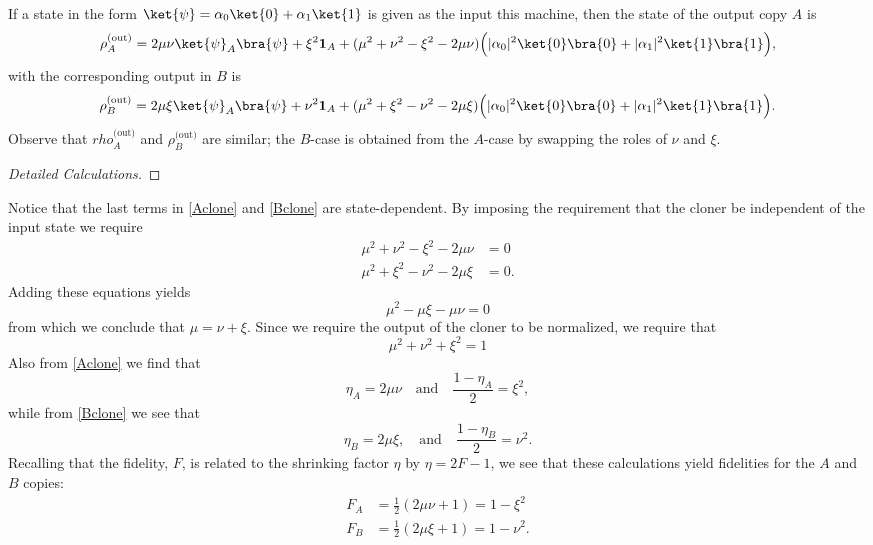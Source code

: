 \documentclass[reqno]{amsart}
\numberwithin{lemma}{section}
\numberwithin{proposition}{section}
\begin{document}
If a state in the form $\ket{\psi} = \alpha_{0} \ket{0} + \alpha_{1} \ket{1}$ is given as the input this machine, then the state of the output copy $A$ is
\begin{equation}
\label{Aclone}
    \rho_{A}^{\text{(out)}} = 2 \mu \nu \ket{\psi}_{A} \bra{\psi} + \xi^{2} \mathbf{1}_{A} + (\mu^{2} + \nu^{2} - \xi^{2} - 2\mu \nu)\Big ( \vert \alpha_{0} \vert^{2} \ket{0} \bra{0} + \vert \alpha_{1} \vert^{2} \ket{1} \bra{1} \Big ),
\end{equation}
with the corresponding  output in $B$ is
\begin{equation}
\label{Bclone}
    \rho_{B}^{\text{(out)}} = 2 \mu \xi \ket{\psi}_{A} \bra{\psi} + \nu^{2} \mathbf{1}_{A} + (\mu^{2} + \xi^{2} - \nu^{2} - 2\mu \xi)\Big ( \vert \alpha_{0} \vert^{2} \ket{0} \bra{0} + \vert \alpha_{1} \vert^{2} \ket{1} \bra{1} \Big ).
\end{equation}
Observe that $rho_{A}^{\text{(out)}}$ and $\rho_{B}^{\text{(out)}}$ are similar; the $B$-case is obtained from the $A$-case by swapping the roles of $\nu$ and $\xi$.

\begin{proof}[Detailed Calculations]
{\color{red}{Need to fill in the calculations for the reduced density operators above.}}
\end{proof}

Notice that the last terms in \eqref{Aclone} and \eqref{Bclone} are state-dependent. By imposing the requirement that the cloner be independent of the input state we require
\begin{align*}
    \mu^{2} + \nu^{2} - \xi^{2} - 2\mu \nu &= 0\\
    \mu^{2} + \xi^{2} - \nu^{2} - 2\mu \xi &= 0.
\end{align*}
Adding these equations yields
\begin{equation*}
    \mu^{2} - \mu \xi - \mu \nu = 0
\end{equation*}
from which we conclude that $\mu = \nu + \xi$. Since we require the output of the cloner to be normalized, we require that
\begin{equation}
\label{normalization}
    \mu^{2} + \nu^{2} + \xi^{2} = 1
\end{equation}
Also from \eqref{Aclone} we find that
\begin{equation*}
    \eta_{A} = 2\mu \nu \quad \text{and}  \quad \frac{1 - \eta_{A}}{2} = \xi^{2},
\end{equation*}
while from \eqref{Bclone} we see that
\begin{equation*}
    \eta_{B} = 2 \mu \xi, \quad \text{and} \quad \frac{1 - \eta_{B}}{2} = \nu^{2}.
\end{equation*}
Recalling that the fidelity, $F$, is related to the shrinking factor $\eta$ by $\eta = 2F - 1$, we see that these calculations yield fidelities for the $A$ and $B$ copies:
\begin{align*} 
    F_{A} &= \frac{1}{2} (2 \mu \nu + 1) = 1 - \xi^{2}\\
    F_{B} &= \frac{1}{2} (2 \mu \xi + 1) = 1 - \nu^{2}.
\end{align*}
\end{document}
